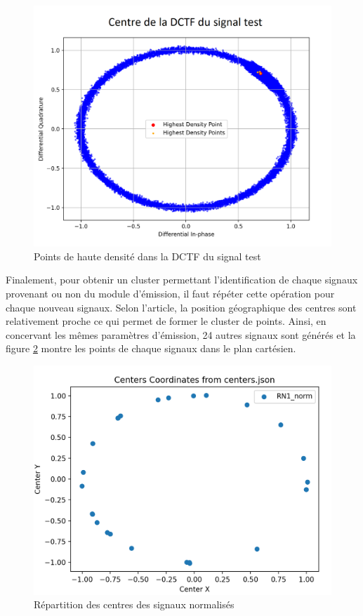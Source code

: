 \begin{figure}[h]
\centering

\includegraphics[scale=0.35]{images/dctf6.png}
\caption{Points de haute densité dans la DCTF du signal test}\label{term319}
\end{figure}


Finalement, pour obtenir un cluster permettant l'identification de chaque signaux provenant ou non du module d'émission, il faut répéter cette opération pour chaque nouveau signaux. Selon l'article, la position géographique des centres sont relativement proche ce qui permet de former le cluster de points. Ainsi, en concervant les mêmes paramètres d'émission, 24 autres signaux sont générés et la figure \ref{term320} montre les points de chaque signaux dans le plan cartésien.



\begin{figure}[h]
\centering

\includegraphics[scale=0.3]{images/cluster.png}
\caption{Répartition des centres des signaux normalisés}\label{term320}
\end{figure}


